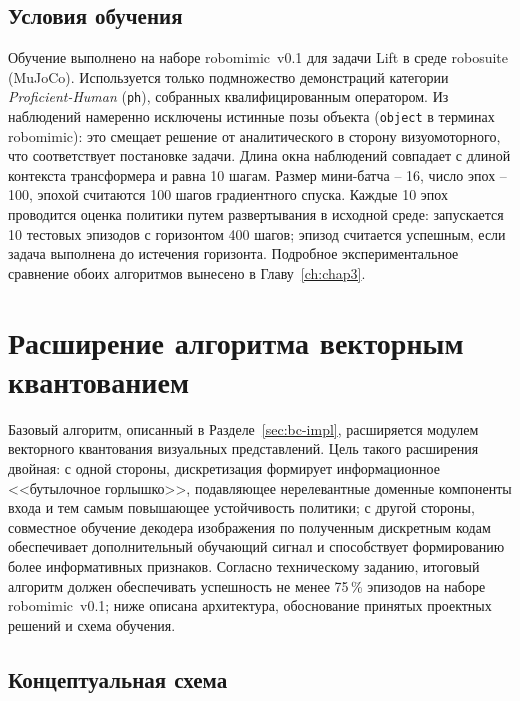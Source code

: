 \subsection{Условия обучения}
\label{subsec:bc-training}

Обучение выполнено на наборе robomimic~v0.1 для задачи Lift в среде robosuite (MuJoCo). Используется только подмножество демонстраций категории \emph{Proficient-Human} (\texttt{ph}), собранных квалифицированным оператором. Из наблюдений намеренно исключены истинные позы объекта (\texttt{object} в терминах robomimic): это смещает решение от аналитического в сторону визуомоторного, что соответствует постановке задачи. Длина окна наблюдений совпадает с длиной контекста трансформера и равна 10 шагам. Размер мини-батча -- 16, число эпох -- 100, эпохой считаются 100 шагов градиентного спуска. Каждые 10 эпох проводится оценка политики путем развертывания в исходной среде: запускается 10 тестовых эпизодов с горизонтом 400 шагов; эпизод считается успешным, если задача выполнена до истечения горизонта. Подробное экспериментальное сравнение обоих алгоритмов вынесено в Главу~\ref{ch:chap3}.

\section{Расширение алгоритма векторным квантованием}
\label{sec:vq-impl}

Базовый алгоритм, описанный в Разделе~\ref{sec:bc-impl}, расширяется модулем векторного квантования визуальных представлений. Цель такого расширения двойная: с одной стороны, дискретизация формирует информационное <<бутылочное горлышко>>, подавляющее нерелевантные доменные компоненты входа \cite{yang2023vector} и тем самым повышающее устойчивость политики; с другой стороны, совместное обучение декодера изображения по полученным дискретным кодам обеспечивает дополнительный обучающий сигнал и способствует формированию более информативных признаков. Согласно техническому заданию, итоговый алгоритм должен обеспечивать успешность не менее 75\,\% эпизодов на наборе robomimic~v0.1; ниже описана архитектура, обоснование принятых проектных решений и схема обучения.

\subsection{Концептуальная схема}
\label{subsec:vq-overview}

